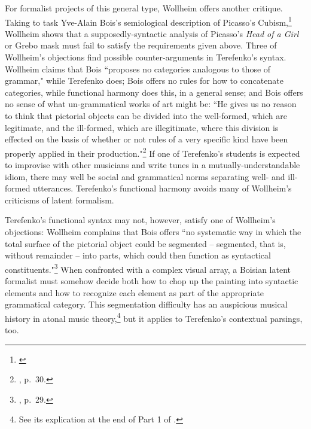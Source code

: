 For formalist projects of this general type, Wollheim offers another critique.  Taking to task Yve-Alain Bois's semiological description of Picasso's Cubism,\footnote{\cite{bois1992}} Wollheim shows that a supposedly-syntactic analysis of Picasso's \emph{Head of a Girl} or Grebo mask must fail to satisfy the requirements given above.  Three of Wollheim's objections find possible counter-arguments in Terefenko's syntax.  Wollheim claims that Bois ``proposes no categories analogous to those of grammar," while Terefenko does; Bois offers no rules for how to concatenate categories, while functional harmony does this, in a general sense; and Bois offers no sense of what un-grammatical works of art might be: ``He gives us no reason to think that pictorial objects can be divided into the well-formed, which are legitimate, and the ill-formed, which are illegitimate, where this division is effected on the basis of whether or not rules of a very specific kind have been properly applied in their production."\footnote{\cite{wollheim1995}, p.\ 30.}  If one of Terefenko's students is expected to improvise with other musicians and write tunes in a mutually-understandable idiom, there may well be social and grammatical norms separating well- and ill-formed utterances.  Terefenko's functional harmony avoids many of Wollheim's criticisms of latent formalism.

Terefenko's functional syntax may not, however, satisfy one of Wollheim's objections:  Wollheim complains that Bois offers ``no systematic way in which the total surface of the pictorial object could be segmented -- segmented, that is, without remainder -- into parts, which could then function as syntactical constituents."\footnote{\cite{wollheim1995}, p.\ 29.}  When confronted with a complex visual array, a Boisian latent formalist must somehow decide both how to chop up the painting into syntactic elements and how to recognize each element as part of the appropriate grammatical category.  This segmentation difficulty has an auspicious musical history in atonal music theory,\footnote{See its explication at the end of Part 1 of \cite{forte1973}.} but it applies to Terefenko's contextual parsings, too.

